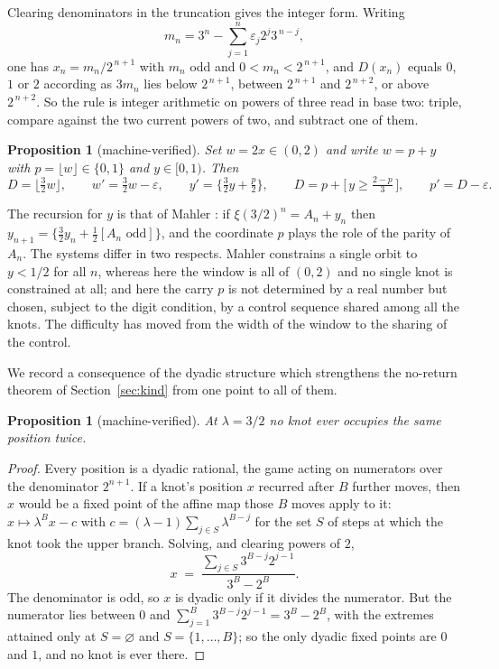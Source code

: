 \documentclass[11pt,reqno]{amsart}
\theoremstyle{plain}
\newtheorem{proposition}[theorem]{Proposition}
\theoremstyle{definition}
\theoremstyle{remark}
\begin{document}
Clearing denominators in the truncation gives the integer form. Writing
\[
  m_n=3^n-\sum_{j=1}^{n}\varepsilon_j2^{j}3^{\,n-j},
\]
one has $x_n=m_n/2^{\,n+1}$ with $m_n$ odd and $0<m_n<2^{\,n+1}$, and
$D(x_n)$ equals $0$, $1$ or $2$ according as $3m_n$ lies below $2^{\,n+1}$,
between $2^{\,n+1}$ and $2^{\,n+2}$, or above $2^{\,n+2}$. So the rule is
integer arithmetic on powers of three read in base two: triple, compare against
the two current powers of two, and subtract one of them.

\begin{proposition}[machine-verified]\label{prop:mahler}
Set $w=2x\in(0,2)$ and write $w=p+y$ with $p=\lfloor w\rfloor\in\{0,1\}$ and
$y\in[0,1)$. Then
\[
  D=\lfloor \tfrac32 w\rfloor,\qquad
  w'=\tfrac32w-\varepsilon,\qquad
  y'=\bigl\{\tfrac32y+\tfrac p2\bigr\},\qquad
  D=p+\bigl[\,y\geq\tfrac{2-p}{3}\,\bigr],\qquad p'=D-\varepsilon .
\]
\end{proposition}

The recursion for $y$ is that of Mahler \cite{Mahler1968}: if
$\xi(3/2)^n=A_n+y_n$ then $y_{n+1}=\{\tfrac32y_n+\tfrac12[A_n\text{ odd}]\}$,
and the coordinate $p$ plays the role of the parity of $A_n$. The systems differ
in two respects. Mahler constrains a single orbit to $y<1/2$ for all $n$,
whereas here the window is all of $(0,2)$ and no single knot is constrained at
all; and here the carry $p$ is not determined by a real number but chosen,
subject to the digit condition, by a control sequence shared among all the
knots. The difficulty has moved from the width of the window to the sharing of
the control.

We record a consequence of the dyadic structure which strengthens the
no-return theorem of Section~\ref{sec:kind} from one point to all of them.

\begin{proposition}[machine-verified]\label{prop:norecur}
At $\lambda=3/2$ no knot ever occupies the same position twice.
\end{proposition}

\begin{proof}
Every position is a dyadic rational, the game acting on numerators over the
denominator $2^{n+1}$. If a knot's position $x$ recurred after $B$ further
moves, then $x$ would be a fixed point of the affine map those $B$ moves apply
to it: $x\mapsto\lambda^Bx-c$ with
$c=(\lambda-1)\sum_{j\in S}\lambda^{B-j}$ for the set $S$ of steps at which
the knot took the upper branch. Solving, and clearing powers of $2$,
\[
  x\;=\;\frac{\sum_{j\in S}3^{B-j}2^{j-1}}{3^B-2^B}.
\]
The denominator is odd, so $x$ is dyadic only if it divides the numerator. But
the numerator lies between $0$ and $\sum_{j=1}^B3^{B-j}2^{j-1}=3^B-2^B$, with
the extremes attained only at $S=\varnothing$ and $S=\{1,\dots,B\}$; so the
only dyadic fixed points are $0$ and $1$, and no knot is ever there.
\end{proof}
\end{document}
